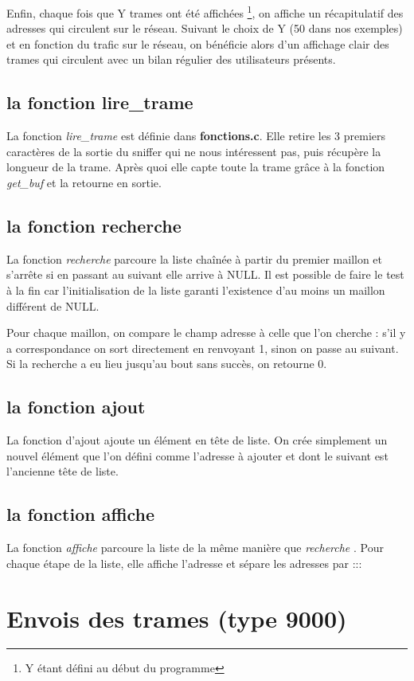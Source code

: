 \documentclass[a4paper,11pt]{article}
\begin{document}
	Enfin, chaque fois que Y trames ont été affichées \footnote{Y étant défini au début du programme}, on affiche un récapitulatif des adresses qui circulent sur le réseau. Suivant le choix de Y (50 dans nos exemples) et en fonction du trafic sur le réseau, on bénéficie alors d'un affichage clair des trames qui circulent avec un bilan régulier des utilisateurs présents. %
	\subsection{la fonction lire\_trame}
	La fonction \textit{lire\_trame} est définie dans \textbf{fonctions.c}. Elle retire les 3 premiers caractères de la sortie du sniffer qui ne nous intéressent pas, puis récupère la longueur de la trame. Après quoi elle capte toute la trame grâce à la fonction \textit{get\_buf} et la retourne en sortie.
	\subsection{la fonction recherche}
	La fonction \textit{ recherche} parcoure la liste chaînée à partir du premier maillon et s'arrête si en passant au suivant elle arrive à NULL. Il est possible de faire le test à la fin car l'initialisation de la liste garanti l'existence d'au moins un maillon différent de NULL.

	Pour chaque maillon, on compare le champ adresse à celle que l'on cherche : s'il y a correspondance on sort directement en renvoyant 1, sinon on passe au suivant. Si la recherche a eu lieu jusqu'au bout sans succès, on retourne 0.
	\subsection{la fonction ajout}
	La fonction d'ajout ajoute un élément en tête de liste. On crée simplement un nouvel élément que l'on défini comme l'adresse à ajouter et dont le suivant est l'ancienne tête de liste.
	\subsection{la fonction affiche}
	La fonction  \textit{affiche} parcoure la liste de la même manière que  \textit{recherche} . Pour chaque étape de la liste, elle affiche l'adresse et sépare les adresses par :::
	\section{Envois des trames (type 9000)}
\end{document}
